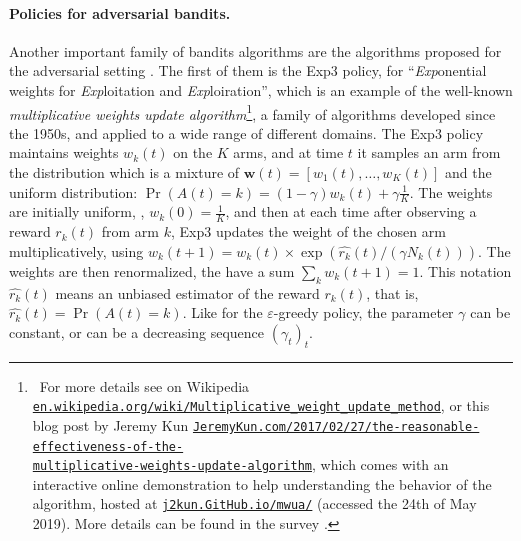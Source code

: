 \paragraph{Policies for adversarial bandits.}

Another important family of bandits algorithms are the algorithms proposed for the adversarial setting \cite{Auer02NonStochastic}.
The first of them is the Exp3 policy, for ``\emph{Exp}onential weights for \emph{Exp}loitation and \emph{Exp}loiration'',
which is an example of the well-known \emph{multiplicative weights update algorithm}\footnote{~For more details see
on Wikipedia \href{https://en.wikipedia.org/wiki/Multiplicative_weight_update_method}{\texttt{en.wikipedia.org/wiki/Multiplicative\_weight\_update\_method}},
or this blog post by Jeremy Kun \href{https://jeremykun.com/2017/02/27/the-reasonable-effectiveness-of-the-multiplicative-weights-update-algorithm/}{\texttt{JeremyKun.com/2017/02/27/the-reasonable-effectiveness-of-the-}}\\
\href{https://jeremykun.com/2017/02/27/the-reasonable-effectiveness-of-the-multiplicative-weights-update-algorithm/}{\texttt{multiplicative-weights-update-algorithm}},
which comes with an interactive online demonstration to help understanding the behavior of the algorithm, hosted at \href{https://j2kun.github.io/mwua/index.html}{\texttt{j2kun.GitHub.io/mwua/}} (accessed the 24th of May 2019). More details can be found in the survey \cite{Arora2012multiplicative}.},
a family of algorithms developed since the 1950s, and applied to a wide range of different domains.
%
The Exp3 policy maintains weights $w_k(t)$ on the $K$ arms, and at time $t$ it samples an arm from the distribution which is a mixture of $\bm{w}(t)=[w_1(t),\dots,w_K(t)]$ and the uniform distribution:
$\Pr(A(t)=k) = (1-\gamma) w_k(t) + \gamma \frac{1}{K}$.
The weights are initially uniform, \ie, $w_k(0)=\frac{1}{K}$, and then at each time after observing a reward $r_k(t)$ from arm $k$, Exp3 updates the weight of the chosen arm multiplicatively, using $w_k(t+1) = w_k(t) \times \exp(\widehat{r_k}(t) / (\gamma N_k(t)))$. The weights are then renormalized, the have a sum $\sum_k w_k(t+1) = 1$.
This notation $\widehat{r_k}(t)$ means an unbiased estimator of the reward $r_k(t)$, that is, $\widehat{r_k}(t) = \Pr(A(t)=k)$.
%
Like for the $\varepsilon$-greedy policy, the parameter $\gamma$ can be constant, or can be a decreasing sequence $(\gamma_t)_t$.
